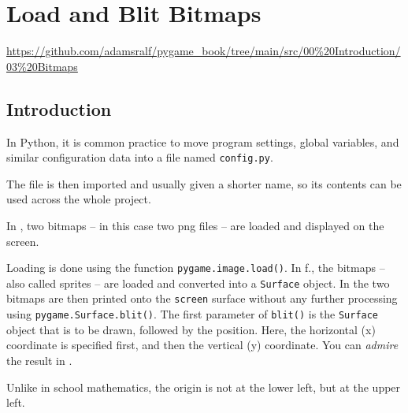 \newpage
\section{Load and Blit Bitmaps}\label{secBitmapLaden}
\begin{diskbox}
	\url{https://github.com/adamsralf/pygame_book/tree/main/src/00%20Introduction/03%20Bitmaps}
\end{diskbox}
\subsection{Introduction}

\begin{hintbox}[config.py]
	In Python, it is common practice to move program settings, global variables, and similar configuration data into a file named \texttt{config.py}.
\end{hintbox}


The file is then imported and usually given a shorter name, so its contents can be used across the whole project.


In , two bitmaps -- in this case two \Gls{png} files -- are loaded and displayed on the screen.

Loading is done using the function \texttt{pygame.image.load()}. In f., the bitmaps -- also called \glspl{sprite} -- are loaded and converted into a \texttt{Surface} object. In  the two bitmaps are then printed onto the \texttt{screen} surface without any further processing using \texttt{pygame.Sur\-face.\-blit()}. The first parameter of \texttt{blit()} is the \texttt{Surface} object that is to be drawn, followed by the position. Here, the horizontal (x) coordinate is specified first, and then the vertical (y) coordinate. You can \emph{admire} the result in .

\begin{hintbox}
	Unlike in school mathematics, the origin is not at the lower left, but at the upper left. 
\end{hintbox}

